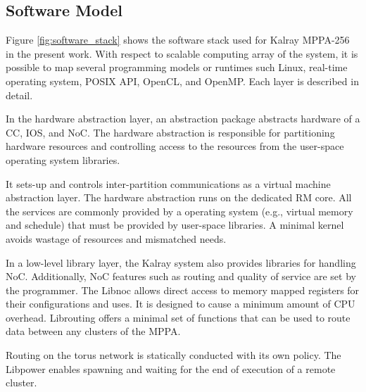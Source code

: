 \documentclass[conference,compsoc]{IEEEtran}
\newcommand{\comment}[1]{}
\begin{document}
\vspace{-3mm}
\subsection{Software Model}
\label{sec:software_model}
\vspace{-3mm}
Figure \ref{fig:software_stack} shows the software stack used for Kalray MPPA-256 in the present work.
With respect to scalable computing array of the system, it is possible to map several programming models or runtimes such Linux, real-time operating system, POSIX API, OpenCL, and OpenMP.
Each layer is described in detail.

In the hardware abstraction layer, an abstraction package abstracts hardware of a CC, IOS, and NoC.
\comment{1-15} %
The hardware abstraction is responsible for partitioning hardware resources and controlling access to the resources from the user-space operating system libraries.
\comment{1-16} 
It sets-up and controls inter-partition communications as a virtual machine abstraction layer.
The hardware abstraction runs on the dedicated RM core.
All the services are commonly provided by a operating system (e.g., virtual memory and schedule) that must be provided by user-space libraries.
A minimal kernel avoids wastage of resources and mismatched needs.

In a low-level library layer, the Kalray system also provides libraries for handling NoC.
Additionally, NoC features such as routing and quality of service are set by the programmer.
The Libnoc allows direct access to memory mapped registers for their configurations and uses.
It is designed to cause a minimum amount of CPU overhead.
Librouting offers a minimal set of functions that can be used to route data between any clusters of the MPPA.

\comment{1-17}
Routing on the torus network is statically conducted with its own policy.
The Libpower enables spawning and waiting for the end of execution of a remote cluster.
\end{document}
